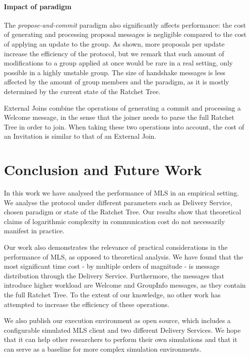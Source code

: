 \documentclass[preprint, 12pt]{elsarticle}
\begin{document}
\paragraph{\textbf{Impact of paradigm}}

The \textit{propose-and-commit} paradigm also significantly affects performance: the cost of generating and processing proposal messages is negligible compared to the cost of applying an update to the group. As shown, more proposals per update increase the efficiency of the protocol, but we remark that such amount of modifications to a group applied at once would be rare in a real setting, only possible in a highly unstable group. The size of handshake messages is less affected by the amount of group members and the paradigm, as it is mostly determined by the current state of the Ratchet Tree. 

External Joins combine the operations of generating a commit and processing a Welcome message, in the sense that the joiner needs to parse the full Ratchet Tree in order to join. When taking these two operations into account, the cost of an Invitation is similar to that of an External Join. 

\section{Conclusion and Future Work}
\label{sec:conclusion}

In this work we have analysed the performance of MLS in an empirical setting. We analyse the protocol under different parameters such as Delivery Service, chosen paradigm or state of the Ratchet Tree. Our results show that theoretical claims of logarithmic complexity in communication cost do not necessarily manifest in practice.

Our work also demonstrates the relevance of practical considerations in the performance of MLS, as opposed to theoretical analysis. We have found that the most significant time cost - by multiple orders of magnitude - is message distribution through the Delivery Service. Furthermore, the messages that introduce higher workload are Welcome and GroupInfo messages, as they contain the full Ratchet Tree. To the extent of our knowledge, no other work has attempted to increase the efficiency of these operations.

We also publish our execution environment as open source, which includes a configurable simulated MLS client and two different Delivery Services. We hope that it can help other researchers to perform their own simulations and that it can serve as a baseline for more complex simulation environments.
\end{document}
